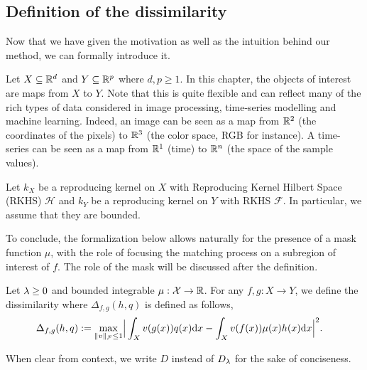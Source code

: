 \subsection{Definition of the dissimilarity}
Now that we have given the motivation as well as the intuition behind our method, we can formally introduce it.


Let $X \subseteq \mathbb R^d$ and $Y \subseteq \mathbb R^p$ where $d, p \geq 1$. In this chapter, the objects of interest are maps from $X$ to $Y$. Note that this is quite flexible and can reflect many of the rich types of data considered in image processing, time-series modelling and machine learning. Indeed, an image can be seen as a map from $\mathbb R^2$ (the coordinates of the pixels) to $\mathbb R^3$ (the color space, RGB for instance). A time-series can be seen as a map from $\mathbb R^1$ (time) to $\mathbb R^n$ (the space of the sample values).

Let $k_X$ be a reproducing kernel on $X$ with Reproducing Kernel Hilbert Space (RKHS) $\mathcal H$  \cite{aronszajn1950theory} and $k_Y$ be a reproducing kernel on $Y$ with RKHS $\mathcal F$. In particular, we assume that they are bounded.


To conclude, the formalization below allows naturally for the presence of a mask function $\mu$, with the role of focusing the matching process on a subregion of interest of $f$. The role of the mask will be discussed after the definition.


\begin{definition}\label{def:D}
    Let $\lambda \geq 0$ and bounded integrable $\mu:{\cal X} \to \mathbb R$.  For any $f,g:X\to Y$, we define the dissimilarity
where $\Delta_{f, g}(h, q)$ is defined as follows,
\begin{align*}
\Delta_{f, g}(h, q) := \max_{\|v\|_{{\cal F}} \leq 1} &\Big|  \int_X v(g(x))q(x)\mathrm{d} x-  \int_X v(f(x))\mu(x)h(x)\mathrm{d} x\Big|^2.
\end{align*}
\end{definition}

\noindent When clear from context, we write $D$ instead of $D_\lambda$ for the sake of conciseness.

